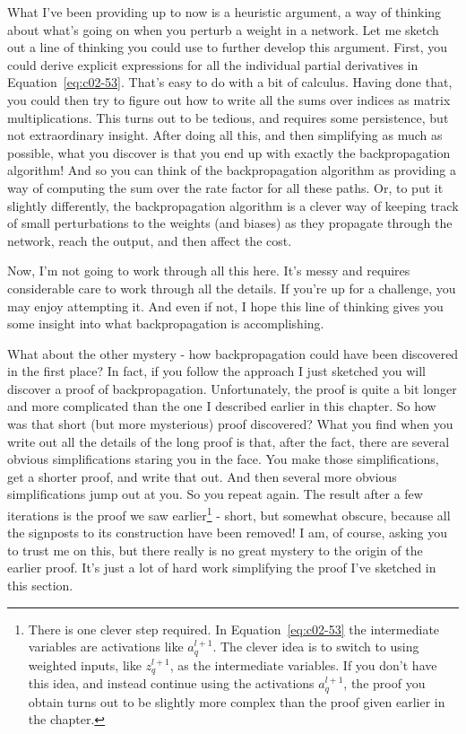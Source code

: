What I've been providing up to now is a heuristic argument, a way of thinking about what's going on when you perturb a weight in a network. Let me sketch out a line of thinking you could use to further develop this argument. First, you could derive explicit expressions for all the individual partial derivatives in Equation~\ref{eq:c02-53}. That's easy to do with a bit of calculus. Having done that, you could then try to figure out how to write all the sums over indices as matrix multiplications. This turns out to be tedious, and requires some persistence, but not extraordinary insight. After doing all this, and then simplifying as much as possible, what you discover is that you end up with exactly the backpropagation algorithm! And so you can think of the backpropagation algorithm as providing a way of computing the sum over the rate factor for all these paths. Or, to put it slightly differently, the backpropagation algorithm is a clever way of keeping track of small perturbations to the weights (and biases) as they propagate through the network, reach the output, and then affect the cost.

Now, I'm not going to work through all this here. It's messy and requires considerable care to work through all the details. If you're up for a challenge, you may enjoy attempting it. And even if not, I hope this line of thinking gives you some insight into what backpropagation is accomplishing.

What about the other mystery - how backpropagation could have been discovered in the first place? In fact, if you follow the approach I just sketched you will discover a proof of backpropagation. Unfortunately, the proof is quite a bit longer and more complicated than the one I described earlier in this chapter. So how was that short (but more mysterious) proof discovered? What you find when you write out all the details of the long proof is that, after the fact, there are several obvious simplifications staring you in the face. You make those simplifications, get a shorter proof, and write that out. And then several more obvious simplifications jump out at you. So you repeat again. The result after a few iterations is the proof we saw earlier\footnote{There is one clever step required. In Equation~\ref{eq:c02-53} the intermediate variables are activations like $a^{l+1}_q$. The clever idea is to switch to using weighted inputs, like $z^{l+1}_q$, as the intermediate variables. If you don't have this idea, and instead continue using the activations $a^{l+1}_q$, the proof you obtain turns out to be slightly more complex than the proof given earlier in the chapter.} - short, but somewhat obscure, because all the signposts to its construction have been removed! I am, of course, asking you to trust me on this, but there really is no great mystery to the origin of the earlier proof. It's just a lot of hard work simplifying the proof I've sketched in this section.
